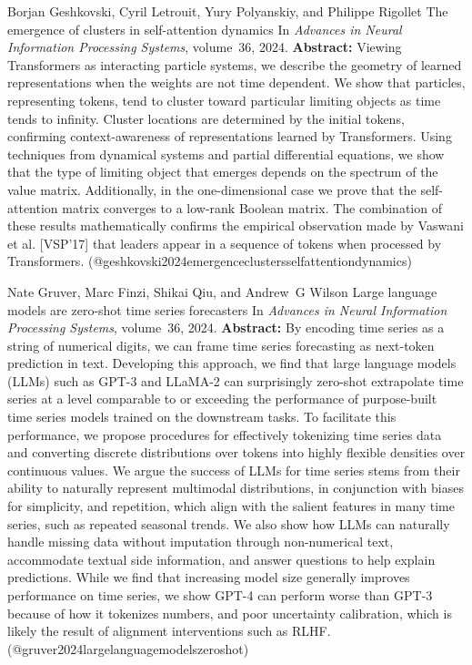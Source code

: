 \documentclass{article} %
\begin{document}
\begin{thebibliography}{}
 Borjan Geshkovski, Cyril Letrouit, Yury Polyanskiy, and Philippe Rigollet \newblock The emergence of clusters in self-attention dynamics \newblock In \emph{Advances in Neural Information Processing Systems}, volume~36, 2024. \newblock \textbf{Abstract:} Viewing Transformers as interacting particle systems, we describe the geometry of learned representations when the weights are not time dependent. We show that particles, representing tokens, tend to cluster toward particular limiting objects as time tends to infinity. Cluster locations are determined by the initial tokens, confirming context-awareness of representations learned by Transformers. Using techniques from dynamical systems and partial differential equations, we show that the type of limiting object that emerges depends on the spectrum of the value matrix. Additionally, in the one-dimensional case we prove that the self-attention matrix converges to a low-rank Boolean matrix. The combination of these results mathematically confirms the empirical observation made by Vaswani et al. [VSP'17] that leaders appear in a sequence of tokens when processed by Transformers. \newblock (@geshkovski2024emergenceclustersselfattentiondynamics)

 Nate Gruver, Marc Finzi, Shikai Qiu, and Andrew~G Wilson \newblock Large language models are zero-shot time series forecasters \newblock In \emph{Advances in Neural Information Processing Systems}, volume~36, 2024. \newblock \textbf{Abstract:} By encoding time series as a string of numerical digits, we can frame time series forecasting as next-token prediction in text. Developing this approach, we find that large language models (LLMs) such as GPT-3 and LLaMA-2 can surprisingly zero-shot extrapolate time series at a level comparable to or exceeding the performance of purpose-built time series models trained on the downstream tasks. To facilitate this performance, we propose procedures for effectively tokenizing time series data and converting discrete distributions over tokens into highly flexible densities over continuous values. We argue the success of LLMs for time series stems from their ability to naturally represent multimodal distributions, in conjunction with biases for simplicity, and repetition, which align with the salient features in many time series, such as repeated seasonal trends. We also show how LLMs can naturally handle missing data without imputation through non-numerical text, accommodate textual side information, and answer questions to help explain predictions. While we find that increasing model size generally improves performance on time series, we show GPT-4 can perform worse than GPT-3 because of how it tokenizes numbers, and poor uncertainty calibration, which is likely the result of alignment interventions such as RLHF. \newblock (@gruver2024largelanguagemodelszeroshot)


\end{thebibliography}
\end{document}
